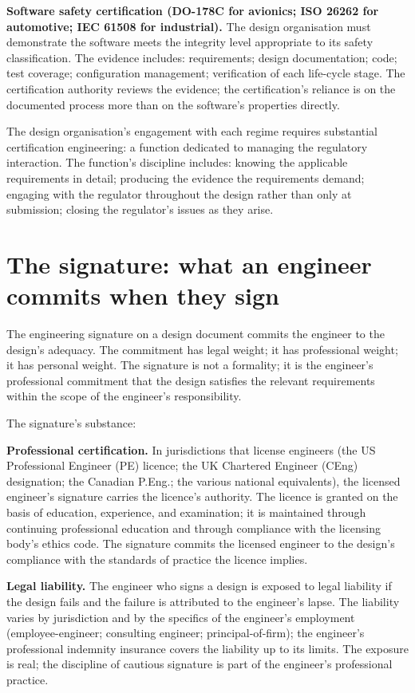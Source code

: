 \textbf{Software safety certification (DO-178C for avionics; ISO 26262 for automotive; IEC 61508 for industrial).} The design organisation must demonstrate the software meets the integrity level appropriate to its safety classification. The evidence includes: requirements; design documentation; code; test coverage; configuration management; verification of each life-cycle stage. The certification authority reviews the evidence; the certification's reliance is on the documented process more than on the software's properties directly.

The design organisation's engagement with each regime requires substantial certification engineering: a function dedicated to managing the regulatory interaction. The function's discipline includes: knowing the applicable requirements in detail; producing the evidence the requirements demand; engaging with the regulator throughout the design rather than only at submission; closing the regulator's issues as they arise.

\section{The signature: what an engineer commits when they sign}

The engineering signature on a design document commits the engineer to the design's adequacy. The commitment has legal weight; it has professional weight; it has personal weight. The signature is not a formality; it is the engineer's professional commitment that the design satisfies the relevant requirements within the scope of the engineer's responsibility.

The signature's substance:

\textbf{Professional certification.} In jurisdictions that license engineers (the US Professional Engineer (PE) licence; the UK Chartered Engineer (CEng) designation; the Canadian P.Eng.; the various national equivalents), the licensed engineer's signature carries the licence's authority. The licence is granted on the basis of education, experience, and examination; it is maintained through continuing professional education and through compliance with the licensing body's ethics code. The signature commits the licensed engineer to the design's compliance with the standards of practice the licence implies.

\textbf{Legal liability.} The engineer who signs a design is exposed to legal liability if the design fails and the failure is attributed to the engineer's lapse. The liability varies by jurisdiction and by the specifics of the engineer's employment (employee-engineer; consulting engineer; principal-of-firm); the engineer's professional indemnity insurance covers the liability up to its limits. The exposure is real; the discipline of cautious signature is part of the engineer's professional practice.

